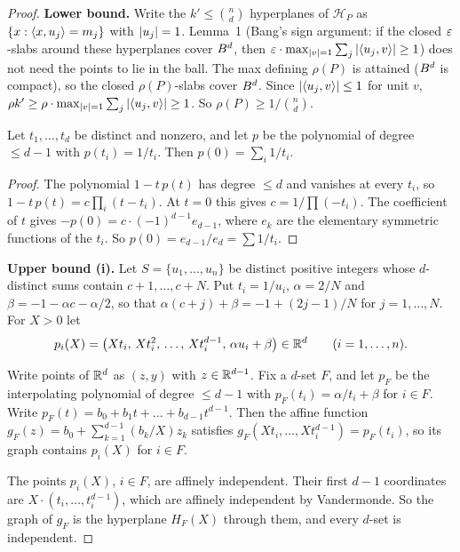 \begin{proof}
\textbf{Lower bound.} Write the $k'\le\binom{n}{d}$ hyperplanes of $\mathcal{H}_P$ as
$\{x:\langle x,u_j\rangle=m_j\}$ with $\left|u_j\right|=1$. Lemma~1 (Bang's sign argument: if the closed
$\varepsilon$-slabs around these hyperplanes cover $B^d$, then
$\varepsilon\cdot\max_{\left|v\right|=1}\sum_j\left|\langle u_j,v\rangle\right|\ge1$) does not need the points to lie in the ball.
The max defining $\rho(P)$ is attained ($B^d$ is compact), so the closed $\rho(P)$-slabs cover
$B^d$. Since $\left|\langle u_j,v\rangle\right|\le1$ for unit $v$,
$\rho k'\ge\rho\cdot\max_{\left|v\right|=1}\sum_j\left|\langle u_j,v\rangle\right|\ge1$. So $\rho(P)\ge1/\binom{n}{d}$.

\begin{lemma}\label{D:interp}
Let $t_1,\dots,t_d$ be distinct and nonzero, and let $p$ be the polynomial of degree $\le d-1$ with
$p(t_i)=1/t_i$. Then $p(0)=\sum_i1/t_i$.
\end{lemma}

\begin{proof}
The polynomial $1-t\,p(t)$ has degree $\le d$ and vanishes at every $t_i$, so
$1-t\,p(t)=c\prod_i(t-t_i)$. At $t=0$ this gives $c=1/\prod(-t_i)$. The coefficient of $t$ gives
$-p(0)=c\cdot(-1)^{d-1}e_{d-1}$, where $e_k$ are the elementary symmetric functions of the $t_i$. So
$p(0)=e_{d-1}/e_d=\sum1/t_i$.
\end{proof}

\textbf{Upper bound (i).} Let $S=\{u_1,\dots,u_n\}$ be distinct positive integers whose
$d$-distinct sums contain $c+1,\dots,c+N$. Put $t_i=1/u_i$, $\alpha=2/N$ and
$\beta=-1-\alpha c-\alpha/2$, so that $\alpha(c+j)+\beta=-1+(2j-1)/N$ for $j=1,\dots,N$. For $X>0$
let
\begin{equation*}
  p_i(X)=\bigl(Xt_i,\,Xt_i^2,\,\dots,\,Xt_i^{d-1},\,\alpha u_i+\beta\bigr)\in\mathbb{R}^d\qquad(i=1,\dots,n).
\end{equation*}

Write points of $\mathbb{R}^d$ as $(z,y)$ with $z\in\mathbb{R}^{d-1}$. Fix a $d$-set $F$, and let $p_F$ be the
interpolating polynomial of degree $\le d-1$ with $p_F(t_i)=\alpha/t_i+\beta$ for $i\in F$. Write
$p_F(t)=b_0+b_1t+\dots+b_{d-1}t^{d-1}$. Then the affine function
$g_F(z)=b_0+\sum_{k=1}^{d-1}(b_k/X)z_k$ satisfies $g_F(Xt_i,\dots,Xt_i^{d-1})=p_F(t_i)$, so its
graph contains $p_i(X)$ for $i\in F$.

The points $p_i(X)$, $i\in F$, are affinely independent. Their first $d-1$ coordinates are
$X\cdot(t_i,\dots,t_i^{d-1})$, which are affinely independent by Vandermonde. So the graph of $g_F$
is the hyperplane $H_F(X)$ through them, and every $d$-set is independent.


\end{proof}
